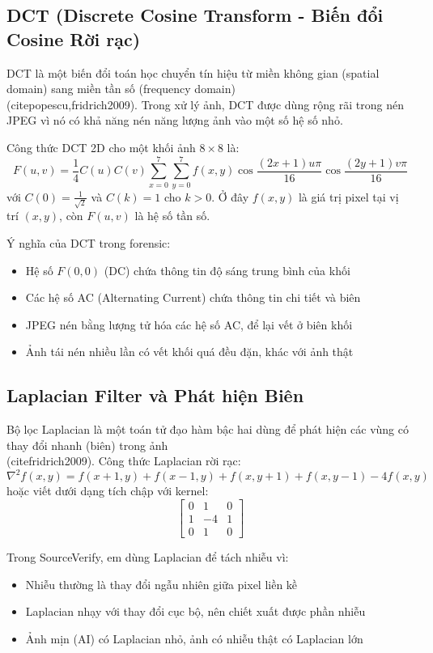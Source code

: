\documentclass[14pt,a4paper,oneside]{report}
\begin{document}
\subsection{DCT (Discrete Cosine Transform - Biến đổi Cosine Rời rạc)}
DCT là một biến đổi toán học chuyển tín hiệu từ miền không gian (spatial domain) sang miền tần số (frequency domain) \\(cite{popescu,fridrich2009}). Trong xử lý ảnh, DCT được dùng rộng rãi trong nén JPEG vì nó có khả năng nén năng lượng ảnh vào một số hệ số nhỏ.

Công thức DCT 2D cho một khối ảnh $8\times8$ là:
\[
F(u,v)=\frac{1}{4}C(u)C(v)\sum_{x=0}^{7}\sum_{y=0}^{7}f(x,y)\cos\frac{(2x+1)u\pi}{16}\cos\frac{(2y+1)v\pi}{16}
\]
với $C(0)=\frac{1}{\sqrt{2}}$ và $C(k)=1$ cho $k>0$. Ở đây $f(x,y)$ là giá trị pixel tại vị trí $(x,y)$, còn $F(u,v)$ là hệ số tần số.

Ý nghĩa của DCT trong forensic:
\begin{itemize}
  \item Hệ số $F(0,0)$ (DC) chứa thông tin độ sáng trung bình của khối
  \item Các hệ số AC (Alternating Current) chứa thông tin chi tiết và biên
  \item JPEG nén bằng lượng tử hóa các hệ số AC, để lại vết ở biên khối
  \item Ảnh tái nén nhiều lần có vết khối quá đều đặn, khác với ảnh thật
\end{itemize}

\subsection{Laplacian Filter và Phát hiện Biên}
Bộ lọc Laplacian là một toán tử đạo hàm bậc hai dùng để phát hiện các vùng có thay đổi nhanh (biên) trong ảnh \\(cite{fridrich2009}). Công thức Laplacian rời rạc:
\[
\nabla^2 f(x,y)=f(x+1,y)+f(x-1,y)+f(x,y+1)+f(x,y-1)-4f(x,y)
\]
hoặc viết dưới dạng tích chập với kernel:
\[
\begin{bmatrix}
0 & 1 & 0 \\
1 & -4 & 1 \\
0 & 1 & 0
\end{bmatrix}
\]

Trong SourceVerify, em dùng Laplacian để tách nhiễu vì:
\begin{itemize}
  \item Nhiễu thường là thay đổi ngẫu nhiên giữa pixel liền kề
  \item Laplacian nhạy với thay đổi cục bộ, nên chiết xuất được phần nhiễu
  \item Ảnh mịn (AI) có Laplacian nhỏ, ảnh có nhiễu thật có Laplacian lớn
\end{itemize}
\end{document}
